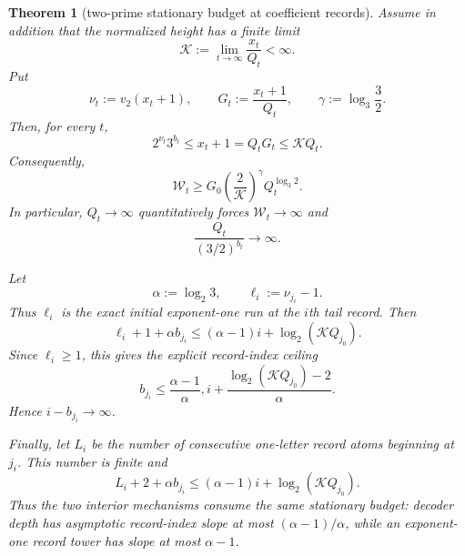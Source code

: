 \documentclass[11pt]{article}
\newtheorem{theorem}{Theorem}
\begin{document}
\begin{theorem}[two-prime stationary budget at coefficient records]
Assume in addition that the normalized height has a finite limit
\[
  \mathcal K:=\lim_{t\to\infty}\frac{x_t}{Q_t}<\infty.
  \tag{50}
\]
Put
\[
  \nu_t:=v_2(x_t+1),
  \qquad
  G_t:=\frac{x_t+1}{Q_t},
  \qquad
  \gamma:=\log_3\frac32.
  \tag{51}
\]
Then, for every $t$,
\[
  \boxed{
  2^{\nu_t}3^{b_t}
  \leq x_t+1
  =Q_tG_t
  \leq \mathcal KQ_t.}
  \tag{52}
\]
Consequently,
\[
  \boxed{
  \mathcal W_t
  \geq
  G_0\left(\frac2{\mathcal K}\right)^\gamma
  Q_t^{\log_3 2}.}
  \tag{53}
\]
In particular, $Q_t\to\infty$ quantitatively forces
$\mathcal W_t\to\infty$ and
\[
  \frac{Q_t}{(3/2)^{b_t}}\longrightarrow\infty.
  \tag{54}
\]

Let
\[
  \alpha:=\log_2 3,
  \qquad
  \ell_i:=\nu_{j_i}-1.
  \tag{55}
\]
Thus $\ell_i$ is the exact initial exponent-one run at the $i$th tail
record.  Then
\[
  \boxed{
  \ell_i+1+\alpha b_{j_i}
  \leq
  (\alpha-1)i+\log_2(\mathcal KQ_{j_0}).}
  \tag{56}
\]
Since $\ell_i\geq1$, this gives the explicit record-index ceiling
\[
  \boxed{
  b_{j_i}
  \leq
  \frac{\alpha-1}{\alpha},i
  +\frac{\log_2(\mathcal KQ_{j_0})-2}{\alpha}.}
  \tag{57}
\]
Hence $i-b_{j_i}\to\infty$.

Finally, let $L_i$ be the number of consecutive one-letter record atoms
beginning at $j_i$.  This number is finite and
\[
  \boxed{
  L_i+2+\alpha b_{j_i}
  \leq
  (\alpha-1)i+\log_2(\mathcal KQ_{j_0}).}
  \tag{58}
\]
Thus the two interior mechanisms consume the same stationary budget:
decoder depth has asymptotic record-index slope at most
$(\alpha-1)/\alpha$, while an exponent-one record tower has slope at most
$\alpha-1$.
\end{theorem}
\end{document}
